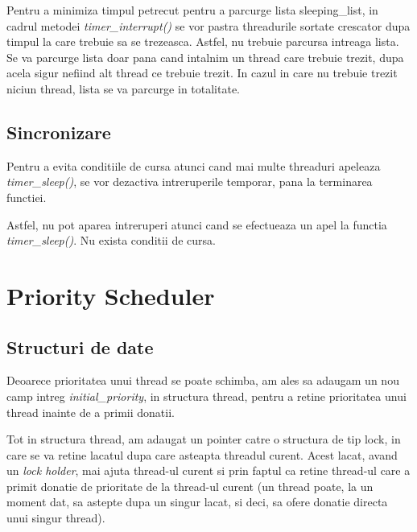 \documentclass[a4paper,12pt]{report}
\begin{document}
Pentru a minimiza timpul petrecut pentru a parcurge lista {sleeping\_list}, in cadrul metodei 
\textit{timer\_interrupt()} se vor pastra threadurile sortate crescator dupa timpul la care trebuie sa se
trezeasca. Astfel, nu trebuie parcursa intreaga lista. Se va parcurge lista doar pana cand intalnim un 
thread care trebuie trezit, dupa acela sigur nefiind alt thread ce trebuie trezit. In cazul in care 
nu trebuie trezit niciun thread, lista se va parcurge in totalitate.
\subsection{Sincronizare}
Pentru a evita conditiile de cursa atunci cand mai multe threaduri apeleaza \textit{timer\_sleep()}, se vor 
dezactiva intreruperile temporar, pana la terminarea functiei.

Astfel, nu pot aparea intreruperi atunci cand se efectueaza un apel la functia \textit{timer\_sleep()}. Nu exista
conditii de cursa.

\section{Priority Scheduler}

\subsection{Structuri de date}
Deoarece prioritatea unui thread se poate schimba, am ales sa adaugam un nou camp intreg \textit{initial\_priority},
in structura thread, pentru a retine prioritatea unui thread inainte de a primii donatii. 

Tot in structura thread, am adaugat un pointer catre o structura de tip lock, in care se va retine lacatul 
dupa care asteapta threadul curent. Acest lacat, avand un \textit{lock holder}, mai ajuta thread-ul curent si 
prin faptul ca retine thread-ul care a primit donatie de prioritate de la thread-ul curent (un thread poate, 
la un moment dat, sa astepte dupa un singur lacat, si deci, sa ofere donatie directa unui singur thread).
\end{document}
